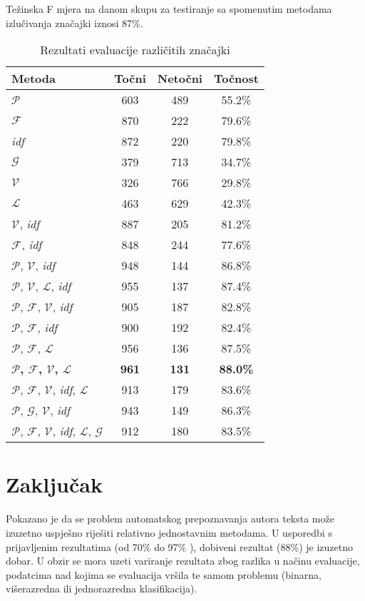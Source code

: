 \documentclass[11pt,english]{article}
\begin{document}
\begin{multicols}{2}
Težinska F mjera na danom skupu za testiranje sa spomenutim metodama
izlučivanja značajki iznosi 87\%.

\begin{table*}[htb]
\caption{Rezultati evaluacije različitih značajki}
\centering
\begin{tabular}{l c c c}
\hline\hline
Metoda & Točni & Netočni & Točnost \\
[0.5ex]
\hline
$\mathcal{P}$ & 603 & 489 & 55.2\% \\
$\mathcal{F}$ & 870 & 222 & 79.6\% \\
\emph{idf} & 872 & 220 & 79.8\% \\
$\mathcal{G}$ & 379 & 713 & 34.7\% \\
$\mathcal{V}$ & 326 & 766 & 29.8\% \\
$\mathcal{L}$ & 463 & 629 & 42.3\% \\
$\mathcal{V}$, \emph{idf} & 887 & 205 & 81.2\% \\
$\mathcal{F}$, \emph{idf} & 848 & 244 & 77.6\% \\
$\mathcal{P}$, $\mathcal{V}$, \emph{idf} & 948 & 144 & 86.8\% \\
$\mathcal{P}$, $\mathcal{V}$, $\mathcal{L}$, \emph{idf} & 955 & 137 & 87.4\% \\
$\mathcal{P}$, $\mathcal{F}$, $\mathcal{V}$, \emph{idf} & 905 & 187 & 82.8\% \\
$\mathcal{P}$, $\mathcal{F}$, \emph{idf} & 900 & 192 & 82.4\% \\
$\mathcal{P}$, $\mathcal{F}$, $\mathcal{L}$ & 956 & 136 & 87.5\% \\
\textbf{$\mathcal{P}$, $\mathcal{F}$, $\mathcal{V}$, $\mathcal{L}$} & \textbf{961} & \textbf{131} & \textbf{88.0\%} \\
$\mathcal{P}$, $\mathcal{F}$, $\mathcal{V}$, \emph{idf}, $\mathcal{L}$ & 913 & 179 & 83.6\% \\
$\mathcal{P}$, $\mathcal{G}$, $\mathcal{V}$, \emph{idf} & 943 & 149 & 86.3\% \\
$\mathcal{P}$, $\mathcal{F}$, $\mathcal{V}$, \emph{idf}, $\mathcal{L}$, $\mathcal{G}$ & 912 & 180 & 83.5\% \\ [1ex]
\hline
\end{tabular}
\label{tbl:eval}%
\end{table*}

\section{Zaključak}
Pokazano je da se problem automatskog prepoznavanja autora teksta može izuzetno
uspješno riješiti relativno jednostavnim metodama. U usporedbi s prijavljenim
rezultatima (od 70\% do 97\%
\citep{coyotl2006authorship,keselj2003n,luyckx2005shallow,stamatatos2001computer,stamatatos1999automatic}),
dobiveni rezultat (88\%) je izuzetno dobar. U obzir se mora uzeti variranje
rezultata zbog razlika u načinu evaluacije, podatcima nad kojima se evaluacija
vršila te samom problemu (binarna, višerazredna ili jednorazredna
klasifikacija).


\end{multicols}
\end{document}
